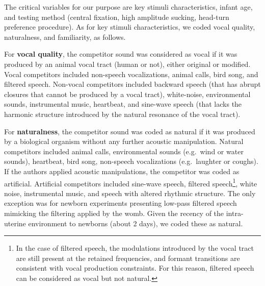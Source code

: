 \documentclass[
  man,mask,floatsintext]{apa6}
\begin{document}
The critical variables for our purpose are key stimuli characteristics, infant age, and testing method (central fixation, high amplitude sucking, head-turn preference procedure). As for key stimuli characteristics, we coded vocal quality, naturalness, and familiarity, as follows.

For \textbf{vocal quality}, the competitor sound was considered as vocal if it was produced by an animal vocal tract (human or not), either original or modified. Vocal competitors included non-speech vocalizations, animal calls, bird song, and filtered speech. Non-vocal competitors included backward speech (that has abrupt closures that cannot be produced by a vocal tract), white-noise, environmental sounds, instrumental music, heartbeat, and sine-wave speech (that lacks the harmonic structure introduced by the natural resonance of the vocal tract).

For \textbf{naturalness}, the competitor sound was coded as natural if it was produced by a biological organism without any further acoustic manipulation. Natural competitors included animal calls, environmental sounds (e.g.~wind or water sounds), heartbeat, bird song, non-speech vocalizations (e.g.~laughter or coughs). If the authors applied acoustic manipulations, the competitor was coded as artificial. Artificial competitors included sine-wave speech, filtered speech\footnote{In the case of filtered speech, the modulations introduced by the vocal tract are still present at the retained frequencies, and formant transitions are consistent with vocal production constraints. For this reason, filtered speech can be considered as vocal but not natural.}, white noise, instrumental music, and speech with altered rhythmic structure. The only exception was for newborn experiments presenting low-pass filtered speech mimicking the filtering applied by the womb. Given the recency of the intra-uterine environment to newborns (about 2 days), we coded these as natural.
\end{document}
